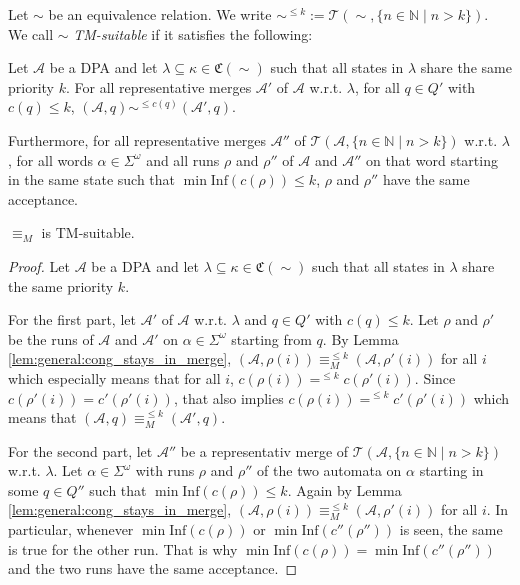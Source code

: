 \begin{defn}
	Let $\sim$ be an equivalence relation. We write $\sim^{\leq k} := \mathcal{T}(\sim, \{n \in \mathbb{N} \mid n > k\})$. We call $\sim$ \emph{TM-suitable} if it satisfies the following: 
	
	Let $\mathcal{A}$ be a DPA and let $\lambda \subseteq \kappa \in \mathfrak{C}(\sim)$ such that all states in $\lambda$ share the same priority $k$. For all representative merges $\mathcal{A}'$ of $\mathcal{A}$ w.r.t. $\lambda$, for all $q \in Q'$ with $c(q) \leq k$, $(\mathcal{A}, q) \sim^{\leq c(q)} (\mathcal{A}', q)$.
	
	Furthermore, for all representative merges $\mathcal{A}''$ of $\mathcal{T}(\mathcal{A}, \{n \in \mathbb{N} \mid n > k\})$ w.r.t. $\lambda$, for all words $\alpha \in \Sigma^\omega$ and all runs $\rho$ and $\rho''$ of $\mathcal{A}$ and $\mathcal{A}''$ on that word starting in the same state such that $\min \text{Inf}(c(\rho)) \leq k$, $\rho$ and $\rho''$ have the same acceptance. %
\end{defn}





\vspace{20pt}

\begin{lem}
	$\equiv_M$ is TM-suitable.
\end{lem}

\begin{proof}
	Let $\mathcal{A}$ be a DPA and let $\lambda \subseteq \kappa \in \mathfrak{C}(\sim)$ such that all states in $\lambda$ share the same priority $k$.
	
	For the first part, let $\mathcal{A}'$ of $\mathcal{A}$ w.r.t. $\lambda$ and $q \in Q'$ with $c(q) \leq k$. Let $\rho$ and $\rho'$ be the runs of $\mathcal{A}$ and $\mathcal{A}'$ on $\alpha \in \Sigma^\omega$ starting from $q$. By Lemma \ref{lem:general:cong_stays_in_merge}, $(\mathcal{A}, \rho(i)) \equiv_M^{\leq k} (\mathcal{A}, \rho'(i))$ for all $i$ which especially means that for all $i$, $c(\rho(i)) =^{\leq k} c(\rho'(i))$. Since $c(\rho'(i)) = c'(\rho'(i))$, that also implies $c(\rho(i)) =^{\leq k} c'(\rho'(i))$ which means that $(\mathcal{A}, q) \equiv_M^{\leq k} (\mathcal{A}', q)$.
	
	For the second part, let $\mathcal{A}''$ be a representativ merge of $\mathcal{T}(\mathcal{A}, \{n \in \mathbb{N} \mid n > k\})$ w.r.t. $\lambda$. Let $\alpha \in \Sigma^\omega$ with runs $\rho$ and $\rho''$ of the two automata on $\alpha$ starting in some $q \in Q''$ such that $\min \text{Inf}(c(\rho)) \leq k$. Again by Lemma \ref{lem:general:cong_stays_in_merge}, $(\mathcal{A}, \rho(i)) \equiv_M^{\leq k} (\mathcal{A}, \rho'(i))$ for all $i$. In particular, whenever $\min \text{Inf}(c(\rho))$ or $\min \text{Inf}(c''(\rho''))$ is seen, the same is true for the other run. That is why $\min \text{Inf}(c(\rho)) = \min \text{Inf}(c''(\rho''))$ and the two runs have the same acceptance.
\end{proof}


